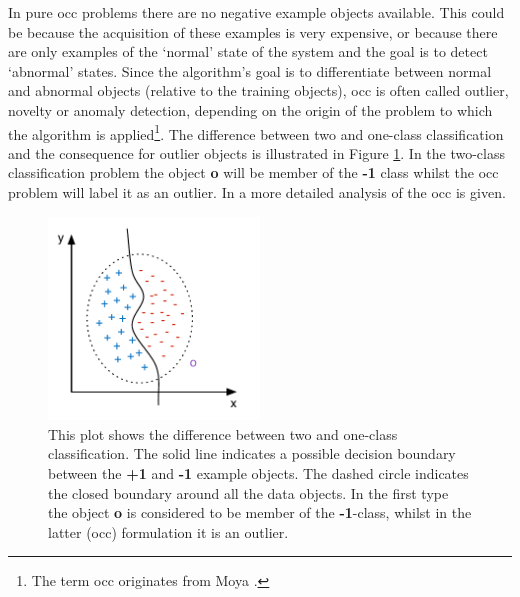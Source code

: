 In pure \gls{occ} problems there are no negative example objects available.
This could be because the acquisition of these examples is very expensive, or because there are only examples of the `normal' state of the system and the goal is to detect `abnormal' states.
Since the algorithm's goal is to differentiate between normal and abnormal objects (relative to the training objects), \gls{occ} is often called outlier, novelty or anomaly detection, depending on the origin of the problem to which the algorithm is applied\footnote{The term \acrlong{occ} originates from Moya \etal \cite{moya1993one}.}.
The difference between two and one-class classification and the consequence for outlier objects is illustrated in Figure \ref{fig:two-vs-one-classification}.
In the two-class classification problem the object \textbf{o} will be member of the \textbf{-1} class whilst the \gls{occ} problem will label it as an outlier.
In \cite{tax2001one} a more detailed analysis of the \gls{occ} is given.

\begin{figure}
  \centering
    \includegraphics[width=0.5\textwidth,keepaspectratio]{./Figures/chapter3/two-vs-one-classification.pdf}
  \caption[Difference between two and one-class classification]{This plot shows the difference between two and one-class classification. The solid line indicates a possible decision boundary between the \textbf{+1} and \textbf{-1} example objects. The dashed circle indicates the closed boundary around all the data objects. In the first type the object \textbf{o} is considered to be member of the \textbf{-1}-class, whilst in the latter (\gls{occ}) formulation it is an outlier.}
  \label{fig:two-vs-one-classification}
\end{figure}

